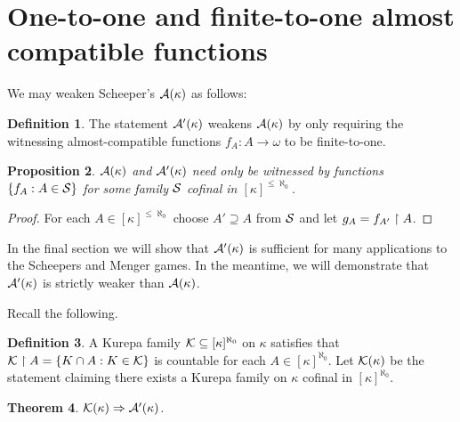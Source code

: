 \documentclass{rmmcart}
\theoremstyle{plain}
\newtheorem{theorem}{Theorem}
\newtheorem{proposition}[theorem]{Proposition}
\theoremstyle{definition}
\newtheorem{definition}[theorem]{Definition}
\theoremstyle{remark}
\theoremstyle{plain}
\theoremstyle{definition}
\theoremstyle{remark}
\begin{document}
  \section{One-to-one and finite-to-one almost compatible functions}

  We may weaken Scheeper's \(\mathcal{A}(\kappa)\) as follows:

  \begin{definition}
    The statement \(\mathcal{A}'(\kappa)\) weakens \(\mathcal{A}(\kappa)\) by only
    requiring the witnessing almost-compatible functions \(f_A:A\to\omega\)
    to be finite-to-one.
  \end{definition}

  \begin{proposition}
    \(\mathcal{A}(\kappa)\) and \(\mathcal{A}'(\kappa)\) need only be witnessed by
    functions \(\{f_A:A\in\mathcal{S}\}\) for some family \(\mathcal{S}\)
    cofinal in \([\kappa]^{\leq\aleph_0}\).
  \end{proposition}

  \begin{proof}
    For each \(A\in[\kappa]^{\leq\aleph_0}\) choose \(A'\supseteq A\)
    from \(\mathcal{S}\) and let \(g_A=f_{A'}\restriction A\).
  \end{proof}

  In the final section we will show that \(\mathcal{A}'(\kappa)\) is sufficient
  for many applications to the Scheepers and Menger games.
  In the meantime, we will demonstrate that \(\mathcal{A}'(\kappa)\) is strictly
  weaker than \(\mathcal{A}(\kappa)\).

  Recall the following.

  \begin{definition}
    A Kurepa family \(\mathcal{K}\subseteq[\kappa]^{\aleph_0}\) on \(\kappa\)
    satisfies that
    \(\mathcal{K}\restriction A=\{K\cap A:K\in\mathcal{K}\}\) is countable
    for each \(A\in[\kappa]^{\aleph_0}\).
    Let \(\mathcal{K}(\kappa)\) be the statement claiming there exists
    a Kurepa family on \(\kappa\)
    cofinal in \([\kappa]^{\aleph_0}\).
  \end{definition}

  \begin{theorem}
    \(\mathcal{K}(\kappa) \Rightarrow \mathcal{A}'(\kappa)\).
  \end{theorem}
\end{document}
